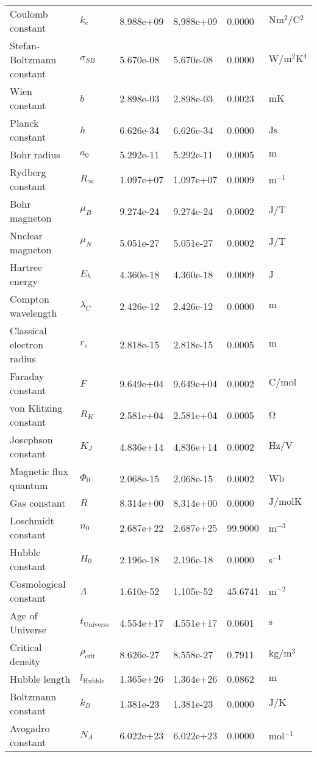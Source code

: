 \documentclass[11pt,a4paper]{article}
\begin{document}
\begin{longtable}{>{\raggedright}p{}p{1.5cm}p{2cm}p{2.5cm}p{2cm}p{2.5cm}}
		Coulomb constant & $k_e$ & 8.988e+09 & 8.988e+09 & 0.0000 & $\si{\newton \meter^2 \per \coulomb^2}$ \\
		Stefan-Boltzmann constant & $\sigma_{SB}$ & 5.670e-08 & 5.670e-08 & 0.0000 & $\si{\watt \per \meter^2 \kelvin^4}$ \\
		Wien constant & $b$ & 2.898e-03 & 2.898e-03 & 0.0023 & $\si{\meter \kelvin}$ \\
		Planck constant & $h$ & 6.626e-34 & 6.626e-34 & 0.0000 & $\si{\joule \second}$ \\
		Bohr radius & $a_0$ & 5.292e-11 & 5.292e-11 & 0.0005 & $\si{\meter}$ \\
		Rydberg constant & $R_\infty$ & 1.097e+07 & 1.097e+07 & 0.0009 & $\si{\meter^{-1}}$ \\
		Bohr magneton & $\mu_B$ & 9.274e-24 & 9.274e-24 & 0.0002 & $\si{\joule \per \tesla}$ \\
		Nuclear magneton & $\mu_N$ & 5.051e-27 & 5.051e-27 & 0.0002 & $\si{\joule \per \tesla}$ \\
		Hartree energy & $E_h$ & 4.360e-18 & 4.360e-18 & 0.0009 & $\si{\joule}$ \\
		Compton wavelength & $\lambda_C$ & 2.426e-12 & 2.426e-12 & 0.0000 & $\si{\meter}$ \\
		Classical electron radius & $r_e$ & 2.818e-15 & 2.818e-15 & 0.0005 & $\si{\meter}$ \\
		Faraday constant & $F$ & 9.649e+04 & 9.649e+04 & 0.0002 & $\si{\coulomb \per \mole}$ \\
		von Klitzing constant & $R_K$ & 2.581e+04 & 2.581e+04 & 0.0005 & $\si{\ohm}$ \\
		Josephson constant & $K_J$ & 4.836e+14 & 4.836e+14 & 0.0002 & $\si{\hertz \per \volt}$ \\
		Magnetic flux quantum & $\Phi_0$ & 2.068e-15 & 2.068e-15 & 0.0002 & $\si{\weber}$ \\
		Gas constant & $R$ & 8.314e+00 & 8.314e+00 & 0.0000 & $\si{\joule \per \mole \kelvin}$ \\
		Loschmidt constant & $n_0$ & 2.687e+22 & 2.687e+25 & 99.9000 & $\si{\meter^{-3}}$ \\
		Hubble constant & $H_0$ & 2.196e-18 & 2.196e-18 & 0.0000 & $\si{\second^{-1}}$ \\
		Cosmological constant & $\Lambda$ & 1.610e-52 & 1.105e-52 & 45.6741 & $\si{\meter^{-2}}$ \\
		Age of Universe & $t_{\text{Universe}}$ & 4.554e+17 & 4.551e+17 & 0.0601 & $\si{\second}$ \\
		Critical density & $\rho_{\text{crit}}$ & 8.626e-27 & 8.558e-27 & 0.7911 & $\si{\kilogram \per \meter^3}$ \\
		Hubble length & $l_{\text{Hubble}}$ & 1.365e+26 & 1.364e+26 & 0.0862 & $\si{\meter}$ \\
		Boltzmann constant & $k_B$ & 1.381e-23 & 1.381e-23 & 0.0000 & $\si{\joule \per \kelvin}$ \\
		Avogadro constant & $N_A$ & 6.022e+23 & 6.022e+23 & 0.0000 & $\si{\mole^{-1}}$ \\
	\end{longtable}
	
\end{document}
